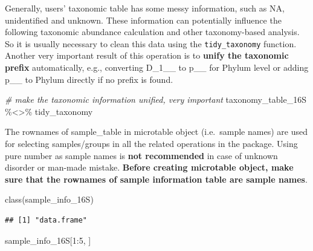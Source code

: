 \documentclass[
]{book}
\newenvironment{Shaded}{\begin{snugshade}}{\end{snugshade}}
\newcommand{\CommentTok}[1]{\textcolor[rgb]{0.56,0.35,0.01}{\textit{#1}}}
\newcommand{\DecValTok}[1]{\textcolor[rgb]{0.00,0.00,0.81}{#1}}
\newcommand{\FunctionTok}[1]{\textcolor[rgb]{0.00,0.00,0.00}{#1}}
\newcommand{\NormalTok}[1]{#1}
\newcommand{\SpecialCharTok}[1]{\textcolor[rgb]{0.00,0.00,0.00}{#1}}
\begin{document}
Generally, users' taxonomic table has some messy information, such as NA, unidentified and unknown.
These information can potentially influence the following taxonomic abundance calculation and other taxonomy-based analysis.
So it is usually necessary to clean this data using the \texttt{tidy\_taxonomy} function.
Another very important result of this operation is to \textbf{unify the taxonomic prefix} automatically,
e.g., converting D\_1\_\_ to p\_\_ for Phylum level or adding p\_\_ to Phylum directly if no prefix is found.

\begin{Shaded}
\begin{Highlighting}[]
\CommentTok{\# make the taxonomic information unified, very important}
\NormalTok{taxonomy\_table\_16S }\SpecialCharTok{\%\textless{}\textgreater{}\%}\NormalTok{ tidy\_taxonomy}
\end{Highlighting}
\end{Shaded}

The rownames of sample\_table in microtable object (i.e.~sample names) are used for selecting samples/groups in all the related operations in the package.
Using pure number as sample names is \textbf{not recommended} in case of unknown disorder or man-made mistake.
\textbf{Before creating microtable object, make sure that the rownames of sample information table are sample names}.

\begin{Shaded}
\begin{Highlighting}[]
\FunctionTok{class}\NormalTok{(sample\_info\_16S)}
\end{Highlighting}
\end{Shaded}

\begin{verbatim}
## [1] "data.frame"
\end{verbatim}

\begin{Shaded}
\begin{Highlighting}[]
\NormalTok{sample\_info\_16S[}\DecValTok{1}\SpecialCharTok{:}\DecValTok{5}\NormalTok{, ]}
\end{Highlighting}
\end{Shaded}
\end{document}
